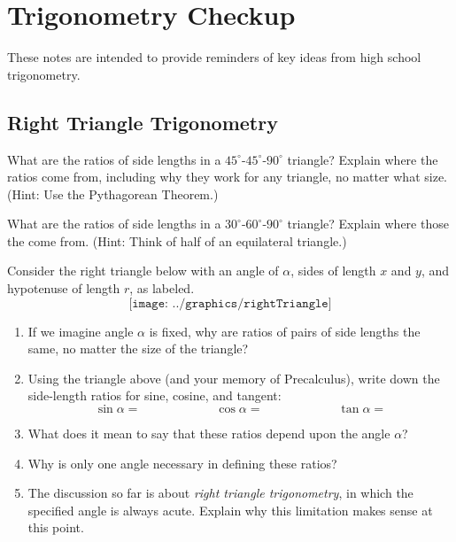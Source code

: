 \newpage 

\section{Trigonometry Checkup}
These notes are intended to provide reminders of key ideas from high school trigonometry. 

\subsection{Right Triangle Trigonometry}
\begin{prob}
What are the ratios of side lengths in a $45^\circ$-$45^\circ$-$90^\circ$ triangle?  Explain where the ratios come from, including why they work for any triangle, no matter what size.  (Hint: Use the Pythagorean Theorem.)
\end{prob}

\begin{prob}
What are the ratios of side lengths in a $30^\circ$-$60^\circ$-$90^\circ$ triangle?  Explain where those the come from.  (Hint: Think of half of an equilateral triangle.)
\end{prob}

\begin{prob}
Consider the right triangle below with an angle of $\alpha$, sides of length $x$ and $y$, and hypotenuse of length $r$, as labeled.  
$$\texttt{[image: ../graphics/rightTriangle]}$$
\begin{enumerate}
\item If we imagine angle $\alpha$ is fixed, why are ratios of pairs of side lengths the same, no matter the size of the triangle?
\item Using the triangle above (and your memory of Precalculus), write down the side-length ratios for sine, cosine, and tangent:  
$$\sin\alpha = \hspace{1in} \cos\alpha = \hspace{1in} \tan\alpha =$$
\item What does it mean to say that these ratios depend upon the angle $\alpha$?  
\item Why is only one angle necessary in defining these ratios?  
\item The discussion so far is about \emph{right triangle trigonometry}, in which the specified angle is always acute.  Explain why this limitation makes sense at this point.  
\end{enumerate}
\end{prob}


